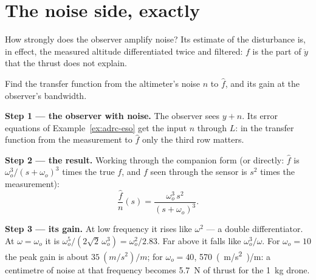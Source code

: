 
\section{The noise side, exactly}

How strongly does the observer amplify noise? Its estimate of the disturbance is, in effect, the measured altitude differentiated twice and filtered: $f$ is the part of $\ddot y$ that the thrust does not explain.

\begin{example}
\label{ex:adrcbw-path}
Find the transfer function from the altimeter's noise $n$ to $\hat f$, and its gain at the observer's bandwidth.

\textbf{Step 1 — the observer with noise.} The observer sees $y + n$. Its error equations of Example~\ref{ex:adrc-eso} get the input $n$ through $L$: in the transfer function from the measurement to $\hat f$ only the third row matters.

\textbf{Step 2 — the result.} Working through the companion form (or directly: $\hat f$ is $\omega_o^3/(s + \omega_o)^3$ times the true $f$, and $f$ seen through the sensor is $s^2$ times the measurement):
\begin{equation}\label{eq:adrcbw-G}
  \frac{\hat f}{n}(s) = \frac{\omega_o^3\,s^2}{(s + \omega_o)^3} .
\end{equation}

\textbf{Step 3 — its gain.} At low frequency it rises like $\omega^2$ — a double differentiator. At $\omega = \omega_o$ it is $\omega_o^5/(2\sqrt2\,\omega_o^3) = \omega_o^2/2.83$. Far above it falls like $\omega_o^3/\omega$. For $\omega_o = 10$ the peak gain is about $\SI{35}{(m/s^2)/m}$; for $\omega_o = 40$, \SI{570}{(m/s^2)/m}: a centimetre of noise at that frequency becomes \SI{5.7}{N} of thrust for the \SI{1}{kg} drone.
\end{example}

